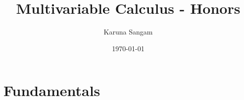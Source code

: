 \documentclass[boxes,sansserif]{seastaralgebras_expository}
\title{Multivariable Calculus - Honors}
\author{Karuna Sangam} %
\date{\today} %
\renewcommand{\sth}{\mid}
\begin{document}
\maketitle


\section{Fundamentals}







\end{document}
